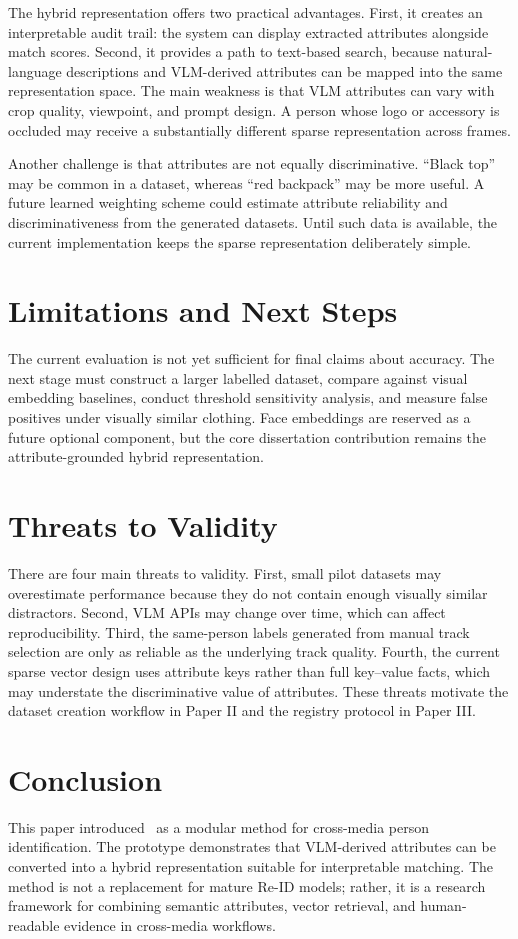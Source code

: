 The hybrid representation offers two practical advantages. First, it creates an interpretable audit trail: the system can display extracted attributes alongside match scores. Second, it provides a path to text-based search, because natural-language descriptions and VLM-derived attributes can be mapped into the same representation space. The main weakness is that VLM attributes can vary with crop quality, viewpoint, and prompt design. A person whose logo or accessory is occluded may receive a substantially different sparse representation across frames.

Another challenge is that attributes are not equally discriminative. ``Black top'' may be common in a dataset, whereas ``red backpack'' may be more useful. A future learned weighting scheme could estimate attribute reliability and discriminativeness from the generated datasets. Until such data is available, the current implementation keeps the sparse representation deliberately simple.

\section{Limitations and Next Steps}

The current evaluation is not yet sufficient for final claims about accuracy. The next stage must construct a larger labelled dataset, compare against visual embedding baselines, conduct threshold sensitivity analysis, and measure false positives under visually similar clothing. Face embeddings are reserved as a future optional component, but the core dissertation contribution remains the attribute-grounded hybrid representation.

\section{Threats to Validity}

There are four main threats to validity. First, small pilot datasets may overestimate performance because they do not contain enough visually similar distractors. Second, VLM APIs may change over time, which can affect reproducibility. Third, the same-person labels generated from manual track selection are only as reliable as the underlying track quality. Fourth, the current sparse vector design uses attribute keys rather than full key--value facts, which may understate the discriminative value of attributes. These threats motivate the dataset creation workflow in Paper II and the registry protocol in Paper III.

\section{Conclusion}

This paper introduced \systemname\ as a modular method for cross-media person identification. The prototype demonstrates that VLM-derived attributes can be converted into a hybrid representation suitable for interpretable matching. The method is not a replacement for mature Re-ID models; rather, it is a research framework for combining semantic attributes, vector retrieval, and human-readable evidence in cross-media workflows.

